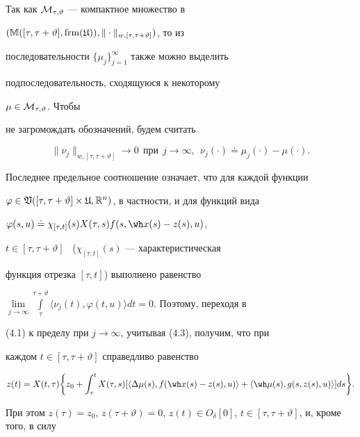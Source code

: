 Так как $\cal M_{\tau,\vartheta }$ --- компактное множество в


$(\Bbb M([\tau,\tau+\vartheta],\frm


(\frak U)),\|\cdot\|_{w,[\tau,\tau+\vartheta]})$, то из


последовательности $\{\mu_j\}_{j=1}^\infty$ также можно выделить


подпоследовательность, сходящуюся к некоторому


$\mu\in\cal M_{\tau,\vartheta}$. Чтобы


не загромождать обозначений, будем считать


\begin{equation}


\|\nu_j\|_{w,[\tau,\tau+\vartheta]}\to0\ \ \text{при}\ \ j\to\infty,


\ \ \nu_j(\cdot)\doteq\mu_j(\cdot)-\mu(\cdot).


\end{equation}


Последнее предельное соотношение означает, что для каждой функции


$\varphi\in\frak V([\tau,\tau+\vartheta]\times


\frak U,\bR^n)$, в частности, и для функций вида


$\varphi(s,u)\doteq\chi_{[\tau,t]}(s)X(\tau,s)f(s,\wh x(s)-z(s),u)$,


$t\in[\tau,\tau+\vartheta]$ \ ($\chi_{[\tau,t]}(s)$ --- характеристическая


функция отрезка $[\tau,t]$) выполнено равенство


$\lim\limits_{j\to\infty }\int\limits_\tau^{\tau+\vartheta}


\langle\nu_j(t),\varphi(t,u)\rangle dt=0$. Поэтому, переходя в


(4.1) к пределу при $j\to\infty$, учитывая (4.3), получим, что при


каждом $t\in[\tau,\tau+\vartheta]$ справедливо равенство


$$


z(t)=X(t,\tau)\bigg\{z_0+\int_{\tau}^{t}X(\tau,s)


[\langle\Delta\mu(s),f(\wh x(s)-z(s),u)\rangle+


\langle\wh\mu(s),g(s,z(s),u)\rangle]ds\bigg\}.


$$


При этом $z(\tau)=z_0$, $z(\tau+\vartheta )=0$, $z(t)\in


O_\delta[0]$, $t\in[\tau,\tau+\vartheta]$, и, кроме того, в силу


